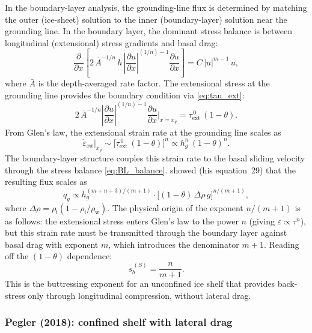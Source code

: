 \documentclass[11pt]{article}
\newcommand{\qg}{q_g}
\newcommand{\hg}{h_g}
\newcommand{\xg}{x_g}
\newcommand{\rhoi}{\rho_{\mathrm{i}}}
\newcommand{\rhow}{\rho_{\mathrm{w}}}
\begin{document}
In the \citet{Schoof2007} boundary-layer analysis, the grounding-line flux is determined by matching the outer (ice-sheet) solution to the inner (boundary-layer) solution near the grounding line.  In the boundary layer, the dominant stress balance is between longitudinal (extensional) stress gradients and basal drag:
\begin{equation}
	\frac{\partial}{\partial x}\!\left[2\,\bar{A}^{-1/n}\,h\,\left|\frac{\partial u}{\partial x}\right|^{(1/n)-1}\frac{\partial u}{\partial x}\right] = C\,|u|^{m-1}\,u,
	\label{eq:BL_balance}
\end{equation}
where $\bar{A}$ is the depth-averaged rate factor.  The extensional stress at the grounding line provides the boundary condition via \cref{eq:tau_ext}:
\begin{equation}
	2\,\bar{A}^{-1/n}\left|\frac{\partial u}{\partial x}\right|^{(1/n)-1}\frac{\partial u}{\partial x}\bigg|_{x = \xg}
	= \tau_{\mathrm{ext}}^{\,0}\,(1 - \theta).
	\label{eq:BL_BC}
\end{equation}
From Glen's law, the extensional strain rate at the grounding line scales as
\begin{equation}
	\dot{\varepsilon}_{xx}\big|_{\xg} \sim \bigl[\tau_{\mathrm{ext}}^{\,0}\,(1-\theta)\bigr]^n
	\propto \hg^n\,(1-\theta)^n.
	\label{eq:strain_rate_GL}
\end{equation}
The boundary-layer structure couples this strain rate to the basal sliding velocity through the stress balance \cref{eq:BL_balance}.  \citet{Schoof2007} showed (his equation~29) that the resulting flux scales as
\begin{equation}
	\qg \propto \hg^{(m+n+3)/(m+1)}\cdot\bigl[(1-\theta)\,\Delta\rho\,g\bigr]^{n/(m+1)},
	\label{eq:schoof_full}
\end{equation}
where $\Delta\rho = \rhoi(1 - \rhoi/\rhow)$.  The physical origin of the exponent $n/(m+1)$ is as follows: the extensional stress enters Glen's law to the power $n$ (giving $\dot{\varepsilon} \propto \tau^n$), but this strain rate must be transmitted through the boundary layer against basal drag with exponent $m$, which introduces the denominator $m+1$.  Reading off the $(1-\theta)$ dependence:
\begin{equation}
	\boxed{s_b^{\,(S)} = \frac{n}{m+1}.}
	\label{eq:sb_schoof}
\end{equation}
This is the buttressing exponent for an unconfined ice shelf that provides back-stress only through longitudinal compression, without lateral drag.

\subsubsection{Pegler (2018): confined shelf with lateral drag}
\label{sec:sb_pegler}
\end{document}
